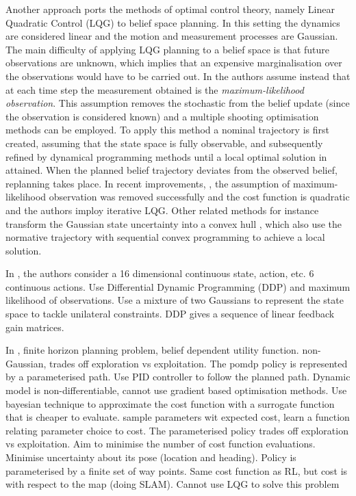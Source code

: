 Another approach ports the methods of optimal control theory, namely Linear Quadratic Control (LQG) to belief space planning. In this 
setting the dynamics are considered linear and the motion and measurement processes are Gaussian. The main difficulty of applying
LQG planning to a belief space is that future observations are unknown, which implies that an expensive marginalisation over the observations
would have to be carried out. In \cite{bsp_rss_2010a} the authors assume instead that at each time step the measurement obtained is the 
\textit{maximum-likelihood observation}. This assumption removes the stochastic from the belief update (since the observation is considered known)
and a multiple shooting optimisation methods can be employed. To apply this method a nominal trajectory is first created, assuming that 
the state space is fully observable, and subsequently refined by dynamical programming methods until a local optimal solution in attained.
When the planned belief trajectory deviates from the observed belief, replanning takes place. In recent improvements, \cite{van_den_Berg_2012},  the assumption of 
maximum-likelihood observation was removed successfully and the cost function is quadratic and the authors imploy iterative LQG. Other related methods 
for instance transform the Gaussian state uncertainty into a convex hull \cite{sigma_hull_iros_2013}, which also use the normative trajectory with sequential convex programming 
to achieve a local solution.

In \cite{Erez10ascalable}, the authors consider a 16 dimensional continuous state, action, etc. 6 continuous actions. Use Differential Dynamic Programming (DDP) and maximum likelihood 
of observations. Use a mixture of two Gaussians to represent the state space to tackle unilateral constraints. DDP gives a sequence of linear feedback gain matrices.	

In \cite{Martinez-Cantin2009}, finite horizon planning problem, belief dependent utility function. non-Gaussian, trades off exploration vs exploitation. The pomdp
policy is represented by a parameterised path. Use PID controller to follow the planned path. Dynamic model is non-differentiable, cannot use gradient based optimisation methods.
Use bayesian technique to approximate the cost function with a surrogate function that is cheaper to evaluate.
sample parameters wit expected cost, learn a function relating parameter choice to cost. The parameterised policy trades off exploration vs exploitation. Aim to 
minimise the number of cost function evaluations. Minimise uncertainty about its pose (location and heading). Policy is parameterised by a finite set of way points.	
Same cost function as RL, but cost is with respect to the map (doing SLAM). Cannot use LQG to solve this problem 

